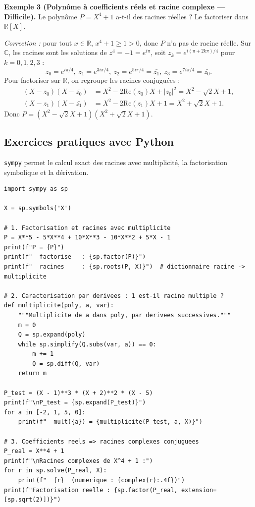 \documentclass[12pt,a4paper]{report}
\theoremstyle{definition}
\theoremstyle{remark}
\begin{document}
\medskip

\textbf{Exemple 3 (Polynôme à coefficients réels et racine complexe --- Difficile).}
Le polynôme $P = X^4 + 1$ a-t-il des racines réelles ? Le factoriser dans $\mathbb{R}[X]$.

\textit{Correction :} pour tout $x \in \mathbb{R}$, $x^4 + 1 \ge 1 > 0$, donc $P$ n'a pas de racine réelle.
Sur $\mathbb{C}$, les racines sont les solutions de $z^4 = -1 = e^{i\pi}$, soit $z_k = e^{i(\pi + 2k\pi)/4}$ pour $k = 0, 1, 2, 3$ :
\[ z_0 = e^{i\pi/4},\ z_1 = e^{3i\pi/4},\ z_2 = e^{5i\pi/4} = \bar{z_1},\ z_3 = e^{7i\pi/4} = \bar{z_0}. \]
Pour factoriser sur $\mathbb{R}$, on regroupe les racines conjuguées :
\begin{align*}
(X - z_0)(X - \bar{z_0}) &= X^2 - 2 \mathrm{Re}(z_0) X + |z_0|^2 = X^2 - \sqrt{2} X + 1, \\
(X - z_1)(X - \bar{z_1}) &= X^2 - 2 \mathrm{Re}(z_1) X + 1 = X^2 + \sqrt{2} X + 1.
\end{align*}
Donc $P = (X^2 - \sqrt{2} X + 1)(X^2 + \sqrt{2} X + 1)$.

\subsection{Exercices pratiques avec Python}
\texttt{sympy} permet le calcul exact des racines avec multiplicité, la factorisation symbolique et la dérivation.

\begin{lstlisting}
import sympy as sp

X = sp.symbols('X')

# 1. Factorisation et racines avec multiplicite
P = X**5 - 5*X**4 + 10*X**3 - 10*X**2 + 5*X - 1
print(f"P = {P}")
print(f"  factorise   : {sp.factor(P)}")
print(f"  racines     : {sp.roots(P, X)}")  # dictionnaire racine -> multiplicite

# 2. Caracterisation par derivees : 1 est-il racine multiple ?
def multiplicite(poly, a, var):
    """Multiplicite de a dans poly, par derivees successives."""
    m = 0
    Q = sp.expand(poly)
    while sp.simplify(Q.subs(var, a)) == 0:
        m += 1
        Q = sp.diff(Q, var)
    return m

P_test = (X - 1)**3 * (X + 2)**2 * (X - 5)
print(f"\nP_test = {sp.expand(P_test)}")
for a in [-2, 1, 5, 0]:
    print(f"  mult({a}) = {multiplicite(P_test, a, X)}")

# 3. Coefficients reels => racines complexes conjuguees
P_real = X**4 + 1
print(f"\nRacines complexes de X^4 + 1 :")
for r in sp.solve(P_real, X):
    print(f"  {r}  (numerique : {complex(r):.4f})")
print(f"Factorisation reelle : {sp.factor(P_real, extension=[sp.sqrt(2)])}")
\end{lstlisting}
\end{document}
